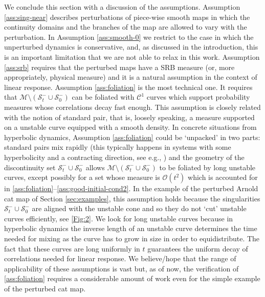 \documentclass{amsart}
\numberwithin{equation}{section}
\newcommand\cC{{\mathcal C}}
\newcommand\cO{{\mathcal O}}
\newcommand\cM{{\mathcal M}}
\newcommand\cS{{\mathcal S}}
\begin{document}
We conclude this section with a discussion of the assumptions. Assumption \ref{ass:sing-near} describes perturbations of piece-wise smooth maps in which the continuity domains and the branches of the map are allowed to vary with the perturbation. In Assumption \ref{ass:smooth-0} we restrict to the case in which the unperturbed dynamics is conservative, and, as discussed in the introduction, this is an important limitation that we are not able to relax in this work. Assumption \ref{ass:srb} requires that the perturbed maps have a SRB measure (or, more appropriately, physical measure) and it is a natural assumption in the context of linear response. Assumption \ref{ass:foliation} is the most technical one. It requires that \(\cM \setminus (\cS_t^{-} \cup \cS_0^{-})\) can be foliated with \(\cC^1\) curves which support probability measures whose correlations decay fast enough. This assumption is closely related with the notion of standard pair, that is, loosely speaking, a measure supported on a unstable curve equipped with a smooth density. In concrete situations from hyperbolic dynamics, Assumption \ref{ass:foliation} could be `unpacked' in two parts: standard pairs mix rapidly (this typically happens in systems with some hyperbolicity and a contracting direction, see e.g., \cite{Dolgopyat04, CM06, DSL16, C99, CD09}) and the geometry of the discontinuity set \(\cS_t^{-} \cup \cS_0^{-}\) allows \(\cM \setminus (\cS_t^{-} \cup \cS_0^{-})\) to be foliated by long unstable curves, except possibly for a set whose measure is \(\cO(t^2)\) which is accounted for in \ref{ass:foliation}–\ref{ass:good-initial-cond2}. In the example of the perturbed Arnold cat map of Section \ref{sec:examples}, this assumption holds because the singularities \(\cS_t^{-} \cup \cS_0^{-}\) are aligned with the unstable cone and so they do not `cut' unstable curves efficiently, see \ref{Fig:2}. We look for long unstable curves because in hyperbolic dynamics the inverse length of an unstable curve determines the time needed for mixing as the curve has to grow in size in order to equidistribute. The fact that these curves are long uniformly in \(t\) guarantees the uniform decay of correlations needed for linear response. We believe/hope that the range of applicability of these assumptions is vast but, as of now, the verification of \ref{ass:foliation} requires a considerable amount of work even for the simple example of the perturbed cat map.
\end{document}
